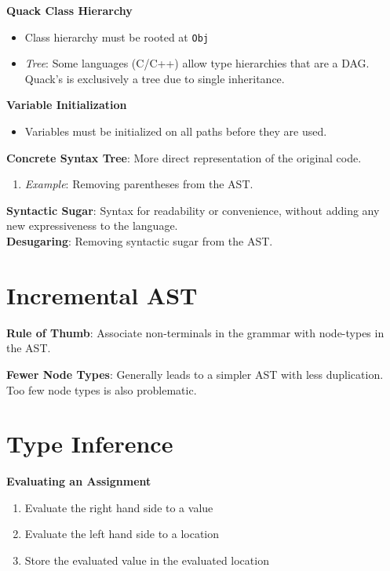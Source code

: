 \documentclass[10pt,twocolumn]{report}
\begin{document}
\textbf{Quack Class Hierarchy}
\begin{itemize}
  \item Class hierarchy must be rooted at \texttt{Obj}
  \item \emph{Tree}: Some languages (C/C++) allow type hierarchies that are a DAG\@.  Quack's is exclusively a tree due to single inheritance.
\end{itemize}

\textbf{Variable Initialization}
\begin{itemize}
  \item Variables must be initialized on all paths before they are used.
\end{itemize}

\textbf{Concrete Syntax Tree}: More direct representation of the original code.
\begin{enumerate}
  \item \emph{Example}: Removing parentheses from the AST.
\end{enumerate}

\textbf{Syntactic Sugar}: Syntax for readability or convenience, without adding any new expressiveness to the language.\\
\textbf{Desugaring}: Removing syntactic sugar from the AST.

\section{Incremental AST}

\textbf{Rule of Thumb}: Associate non-terminals in the grammar with node-types in the AST.

\textbf{Fewer Node Types}: Generally leads to a simpler AST with less duplication.  Too few node types is also problematic.



\section{Type Inference}

\textbf{Evaluating an Assignment}
\begin{enumerate}
  \item Evaluate the right hand side to a value
  \item Evaluate the left hand side to a location
  \item Store the evaluated value in the evaluated location
\end{enumerate}
\end{document}
